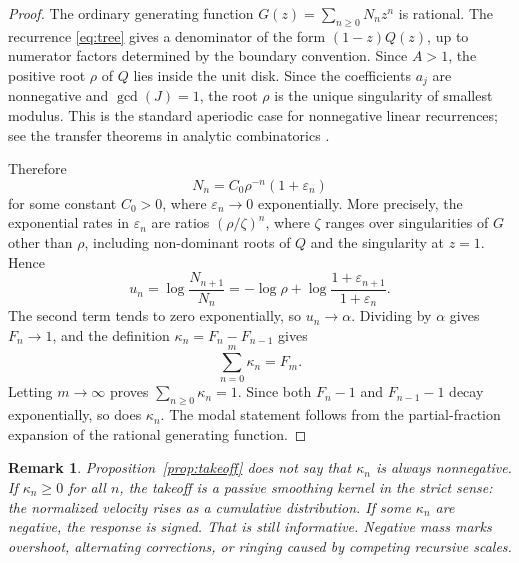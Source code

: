 \documentclass[10pt,twocolumn]{article}
\newtheorem{remark}{Remark}
\begin{document}
\begin{proof}
The ordinary generating function \(G(z)=\sum_{n\ge0}N_nz^n\) is rational.  The recurrence \eqref{eq:tree} gives a denominator of the form \((1-z)Q(z)\), up to numerator factors determined by the boundary convention.  Since \(A>1\), the positive root \(\rho\) of \(Q\) lies inside the unit disk.  Since the coefficients \(a_j\) are nonnegative and \(\gcd(J)=1\), the root \(\rho\) is the unique singularity of smallest modulus.  This is the standard aperiodic case for nonnegative linear recurrences; see the transfer theorems in analytic combinatorics \cite{flajolet2009}.

Therefore
\[
        N_n=C_0\rho^{-n}(1+\varepsilon_n)
\]
for some constant \(C_0>0\), where \(\varepsilon_n\to0\) exponentially.  More precisely, the exponential rates in \(\varepsilon_n\) are ratios \((\rho/\zeta)^n\), where \(\zeta\) ranges over singularities of \(G\) other than \(\rho\), including non-dominant roots of \(Q\) and the singularity at \(z=1\).  Hence
\[
        u_n
        =
        \log\frac{N_{n+1}}{N_n}
        =
        -\log\rho
        +
        \log\frac{1+\varepsilon_{n+1}}{1+\varepsilon_n}.
\]
The second term tends to zero exponentially, so \(u_n\to\alpha\).  Dividing by \(\alpha\) gives \(F_n\to1\), and the definition \(\kappa_n=F_n-F_{n-1}\) gives
\[
        \sum_{n=0}^{m}\kappa_n=F_m.
\]
Letting \(m\to\infty\) proves \(\sum_{n\ge0}\kappa_n=1\).  Since both \(F_n-1\) and \(F_{n-1}-1\) decay exponentially, so does \(\kappa_n\).  The modal statement follows from the partial-fraction expansion of the rational generating function.
\end{proof}

\begin{remark}
Proposition~\ref{prop:takeoff} does not say that \(\kappa_n\) is always nonnegative.  If \(\kappa_n\ge0\) for all \(n\), the takeoff is a passive smoothing kernel in the strict sense: the normalized velocity rises as a cumulative distribution.  If some \(\kappa_n\) are negative, the response is signed.  That is still informative.  Negative mass marks overshoot, alternating corrections, or ringing caused by competing recursive scales.
\end{remark}
\end{document}
